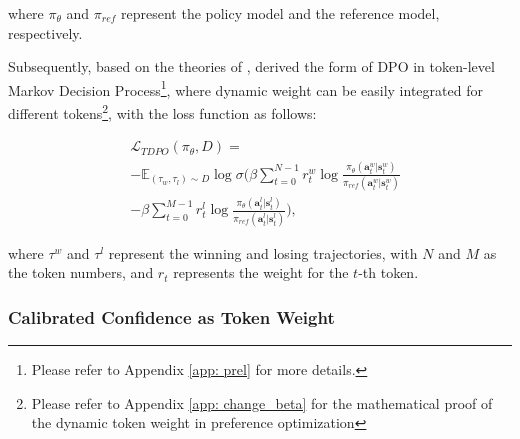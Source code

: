 \vspace{-3mm}

\noindent where $\pi_\theta$ and $\pi_{ref}$ represent the policy model and the reference model, respectively. 

Subsequently, based on the theories of \citet{Levine2018ReinforcementLA}, \citet{rafailov2024rqlanguagemodel} derived the form of DPO in token-level Markov Decision Process\footnote{Please refer to Appendix \ref{app: prel} for more details.}, where dynamic weight can be easily integrated for different tokens\footnote{Please refer to Appendix \ref{app: change_beta} for the mathematical proof of the dynamic token weight in preference optimization}, with the loss function as follows:

\vspace{-8mm}

\begin{align}
& \mathcal{L}_{TDPO}(\pi_{\theta},D) = \nonumber \\
& -\mathbb{E}_{(\tau_w,\tau_l)\sim D} \log \sigma ( \beta \sum_{t=0}^{N-1} r_t^w \log \frac{\pi_{\theta}(\mathbf{a}_t^w|\mathbf{s}_t^w)}{\pi_{ref}(\mathbf{a}_t^w|\mathbf{s}_t^w)} \nonumber \\
& -\beta \sum_{t=0}^{M-1} r_t^l \log \frac{\pi_{\theta}(\mathbf{a}_t^l|\mathbf{s}_t^l)}{\pi_{ref}(\mathbf{a}_t^l|\mathbf{s}_t^l)}),
\label{eq: rdpo}
\end{align}

\vspace{-3mm}

\noindent where $\tau^w$ and $\tau^l$ represent the winning and losing trajectories, with $N$ and $M$ as the token numbers, and $r_t$ represents the weight for the $t$-th token.


\subsubsection{Calibrated Confidence as Token Weight}
\label{sec:entropy}

